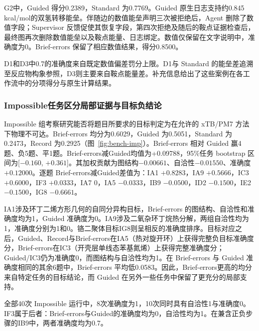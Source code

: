 G2中，Guided 得分0.2389，Standard 为0.7769。Guided 原生日志支持约0.845 kcal/mol的双氢转移能垒。伴随边的数值能垒声明三次被拒绝后，Agent 删除了数值字段；Supervisor 反馈促使其恢复字段，第四次拒绝及随后的鞍点证据检查后，最终图再次删除数值能垒以及鞍点能量、日志绑定。数值仅保留在文字说明中，准确度为0。Brief-errors 保留了相应数值结果，得分0.8500。

D1和D3中0.7的准确度来自既定数值偏差罚分上限。D1与 Standard 的能垒差追溯至反应物构象参照，D3则主要来自鞍点能量差。补充信息给出了这些案例在各工作流中的分项得分与原生计算结果。

\subsubsection{Impossible任务区分局部证据与目标负结论}

Impossible 组考察研究能否将题目所要求的目标判定为在允许的 xTB/PM7 方法下物理不可达。Brief-errors 均分为0.6029，Guided 为0.5051，Standard 为0.2473，Record 为0.2925（图~\ref{fig:bench-imp}）。Brief-errors 相对 Guided 赢4题、负5题、平1题。Brief-errors减Guided均值为+0.09788，95\%任务 bootstrap 区间为[$-0.160$, $+0.361$]。其加权贡献为图结构$-0.00661$、自洽性$-0.01550$、准确度$+0.12000$。逐题 Brief-errors减Guided差值为：IA1 $+0.8283$，IA9 $+0.5666$，IC3 $+0.6000$，IF3 $+0.0333$，IA7 $0$，IA5 $-0.0333$，IB9 $-0.0500$，ID2 $-0.1500$，IE2 $-0.1500$，IG8 $-0.6661$。

IA1涉及环丁二烯方形几何的自同分异构目标，Brief-errors 的图结构、自洽性和准确度均为1，Guided 准确度为0。IA9涉及二氧杂环丁烷热分解，两组自洽性均为1，准确度分别为1和0。铬二聚体目标IG8则呈相反的准确度排序。目标对应之后，Guided、Record与Brief-errors在IA5（热对旋开环）上获得完整负目标准确度分，Brief-errors在IC3（开壳层单线态苯基氮烯）上获得完整准确度分；Guided/IC3仍为准确度0，而图结构与自洽性均为1。在 Brief-errors 与 Guided 准确度相同的其余6题中，Brief-errors 平均低0.0583。因此，Brief-errors更高的均分来自特定任务的目标结论，而 Guided 在另外一些任务中保留了更充分的局部支持。

全部40次 Impossible 运行中，8次准确度为1，10次同时具有自洽性1与准确度0。IF3属于后者：Brief-errors与Guided的准确度均为0，自洽性均为1。在兼含正负步骤的IB9中，两者准确度均为0.7。
